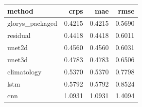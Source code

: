\begin{tabular}{lrrr}
\toprule
method & crps & mae & rmse \\
\midrule
glorys_packaged & 0.4215 & 0.4215 & 0.5690 \\
residual & 0.4418 & 0.4418 & 0.6011 \\
unet2d & 0.4560 & 0.4560 & 0.6031 \\
unet3d & 0.4783 & 0.4783 & 0.6506 \\
climatology & 0.5370 & 0.5370 & 0.7798 \\
lstm & 0.5792 & 0.5792 & 0.8524 \\
cnn & 1.0931 & 1.0931 & 1.4094 \\
\bottomrule
\end{tabular}
